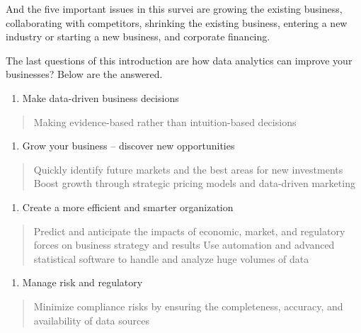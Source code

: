 \documentclass[]{book}
\providecommand{\tightlist}{%
  \setlength{\itemsep}{0pt}\setlength{\parskip}{0pt}}
\begin{document}
And the five important issues in this survei are growing the existing
business, collaborating with competitors, shrinking the existing
business, entering a new industry or starting a new business, and
corporate financing.

The last questions of this introduction are how data analytics can
improve your businesses? Below are the answered.

\begin{enumerate}
\def\labelenumi{\arabic{enumi}.}
\tightlist
\item
  Make data-driven business decisions
\end{enumerate}

\begin{quote}
Making evidence-based rather than intuition-based decisions
\end{quote}

\begin{enumerate}
\def\labelenumi{\arabic{enumi}.}
\setcounter{enumi}{1}
\tightlist
\item
  Grow your business -- discover new opportunities
\end{enumerate}

\begin{quote}
Quickly identify future markets and the best areas for new investments
Boost growth through strategic pricing models and data-driven marketing
\end{quote}

\begin{enumerate}
\def\labelenumi{\arabic{enumi}.}
\setcounter{enumi}{2}
\tightlist
\item
  Create a more efficient and smarter organization
\end{enumerate}

\begin{quote}
Predict and anticipate the impacts of economic, market, and regulatory
forces on business strategy and results Use automation and advanced
statistical software to handle and analyze huge volumes of data
\end{quote}

\begin{enumerate}
\def\labelenumi{\arabic{enumi}.}
\setcounter{enumi}{3}
\tightlist
\item
  Manage risk and regulatory
\end{enumerate}

\begin{quote}
Minimize compliance risks by ensuring the completeness, accuracy, and
availability of data sources
\end{quote}
\end{document}
